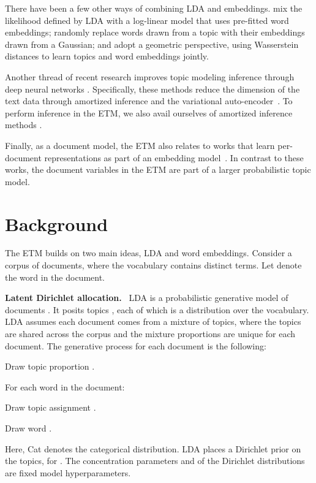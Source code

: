 \documentclass[11pt,a4paper]{article}
\DeclareRobustCommand{\parhead}[1]{\noindent\textbf{#1}~}
\begin{document}
There have been a few other ways of combining \gls{LDA} and
embeddings. \citet{nguyen2015improving} mix the likelihood defined by
\gls{LDA} with a log-linear model that uses pre-fitted word
embeddings; \citet{bunk2018welda} randomly replace words drawn from a
topic with their embeddings drawn from a Gaussian; and
\citet{xu2018distilled} adopt a geometric perspective, using
Wasserstein distances to learn topics and word embeddings jointly.

Another thread of recent research improves topic modeling inference
through deep neural networks \citep{srivastava2017autoencoding,
  card2017neural,cong2017deep, zhang2018whai}. Specifically, these
methods reduce the dimension of the text data through amortized
inference and the variational
auto-encoder~\citep{kingma2014autoencoding, rezende2014stochastic}.
To perform inference in the \gls{ETM}, we also avail ourselves of
amortized inference methods \citep{Gershman2014}.

Finally, as a document model, the \gls{ETM} also relates to works that
learn per-document representations as part of an embedding
model~\citep{Le2014, moody2016mixing, miao2016neural}. In contrast to
these works, the document variables in the \gls{ETM} are part of a larger
probabilistic topic model.




 \section{Background}
\label{sec:background}

The \acrshort{ETM} builds on two main ideas, \gls{LDA} and word
embeddings. Consider a corpus of  documents, where the vocabulary
contains  distinct terms. Let  denote the
 word in the  document.

\parhead{Latent Dirichlet allocation.}  \gls{LDA} is a probabilistic
generative model of documents \citep{blei2003latent}. It posits 
topics , each of which is a distribution over the
vocabulary.  \gls{LDA} assumes each document comes from a mixture of
topics, where the topics are shared across the corpus and the mixture
proportions are unique for each document.  The generative process for
each document is the following:
\begin{compactenum}
\item Draw topic proportion .
\item For each word  in the document:
  \begin{compactenum}
    \setlength{\itemindent}{-0.3cm}
  \item Draw topic assignment .
  \item Draw word .
  \end{compactenum}
\end{compactenum}
Here, Cat denotes the categorical distribution. \gls{LDA}
places a Dirichlet prior on the topics,
 for .
The concentration parameters  and  of the
Dirichlet distributions are fixed model hyperparameters.
\end{document}
